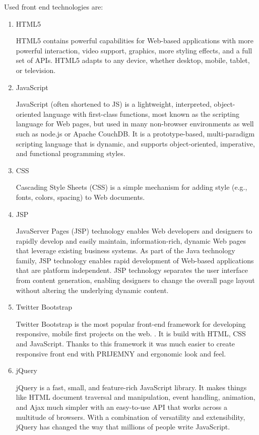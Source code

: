 \documentclass[thesis=B,english]{FITthesis}[2012/10/20]
\begin{document}
Used front end technologies are: 
\begin{enumerate}

\item{HTML5}

HTML5 contains powerful capabilities for Web-based applications with more powerful interaction, video support, graphics, more styling effects, and a full set of APIs. HTML5 adapts to any device, whether desktop, mobile, tablet, or television.\cite{html}

\item{JavaScript}

JavaScript (often shortened to JS) is a lightweight, interpreted, object-oriented language with first-class functions, most known as the scripting language for Web pages, but used in many non-browser environments as well such as node.js or Apache CouchDB. It is a prototype-based, multi-paradigm scripting language that is dynamic, and supports object-oriented, imperative, and functional programming styles.\cite{javascript}

\item{CSS}

Cascading Style Sheets (CSS) is a simple mechanism for adding style (e.g., fonts, colors, spacing) to Web documents.\cite{css}

\item{JSP}

JavaServer Pages (JSP) technology enables Web developers and designers to rapidly develop and easily maintain, information-rich, dynamic Web pages that leverage existing business systems. As part of the Java technology family, JSP technology enables rapid development of Web-based applications that are platform independent. JSP technology separates the user interface from content generation, enabling designers to change the overall page layout without altering the underlying dynamic content.\cite{jsp}

\item{Twitter Bootstrap}

Twitter Bootstrap is the most popular front-end framework for developing responsive, mobile first projects on the web. \cite{bootstrap}. It is build with HTML, CSS and JavaScript. Thanks to this framework it was much easier to create responsive front end with PRIJEMNY  and ergonomic look and feel.

\item{jQuery}

jQuery is a fast, small, and feature-rich JavaScript library. It makes things like HTML document traversal and manipulation, event handling, animation, and Ajax much simpler with an easy-to-use API that works across a multitude of browsers. With a combination of versatility and extensibility, jQuery has changed the way that millions of people write JavaScript.\cite{jQuery}

\end{enumerate}
\end{document}
